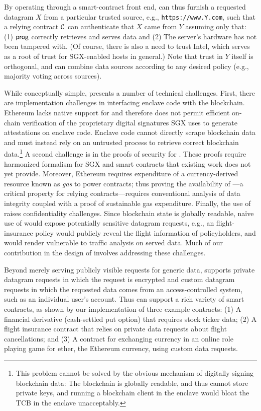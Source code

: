 By operating through a smart-contract front end, \tc can thus furnish a requested datagram $X$ from a particular trusted source, e.g., \texttt{https://www.Y.com}, such that a relying contract ${\cal C}$ can authenticate that $X$ came from $Y$ assuming only that: (1) ${\sf prog}$ correctly retrieves and serves data and (2) The \tc server's hardware has not been tampered with. (Of course, there is also a need to trust Intel, which serves as a root of trust for SGX-enabled hosts in general.) Note that trust in $Y$ itself is orthogonal, and \tc can combine data sources according to any desired policy (e.g., majority voting across sources).

While conceptually simple, \tc presents a number of technical challenges.  First, there are implementation challenges in interfacing enclave code with the blockchain. Ethereum lacks native support for and therefore does not permit efficient on-chain verification of the proprietary digital signatures SGX uses to generate attestations on enclave code. Enclave code cannot directly scrape blockchain data and must instead rely on an untrusted process to retrieve correct blockchain data.\footnote{This problem cannot be solved by the obvious mechanism of digitally signing blockchain data: The blockchain is globally readable, and thus cannot store private keys, and running a blockchain client in the enclave would bloat the TCB in the enclave unacceptably.} A second challenge is in the proofs of security for \tc. These proofs require harmonized formalism for SGX and smart contracts that existing work does not yet provide. Moreover, Ethereum requires expenditure of a currency-derived resource known as \emph{gas} to power contracts; thus proving the availability of \tc---a critical property for relying contracts---requires conventional analysis of data integrity coupled with a proof of sustainable gas expenditure. Finally, the use of \tc raises confidentiality challenges. Since blockchain state is globally readable, na\"{i}ve use of \tc would expose potentially sensitive datagram requests, e.g., an flight-insurance policy would publicly reveal the flight information of policyholders, and would render \tc vulnerable to traffic analysis on served data. Much of our contribution in the design of \tc involves addressing these challenges. 

Beyond merely serving publicly visible requests for generic data, \tc supports private datagram requests in which the request is encrypted and custom datagram requests in which the requested data comes from an access-controlled system, such as an individual user's account. Thus \tc can support a rich variety of smart contracts, as shown by our implementation of three example contracts: (1) A financial derivative (cash-settled put option) that requires stock ticker data; (2) A flight insurance contract that relies on private data requests about flight cancellations; and (3) A contract for exchanging currency in an online role playing game for ether, the Ethereum currency, using custom data requests.

